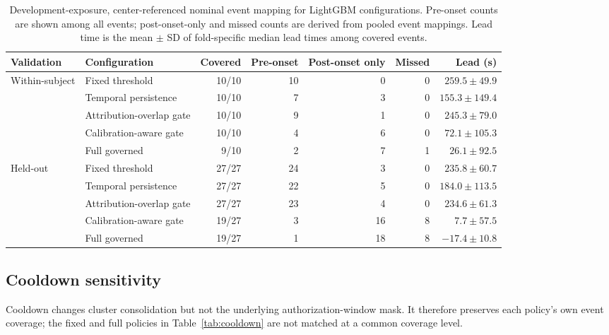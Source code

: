 \documentclass[11pt,a4paper]{article}
\begin{document}
\begin{table}[H]
\centering
\caption{Development-exposure, center-referenced nominal event mapping for LightGBM configurations. Pre-onset counts are shown among all events; post-onset-only and missed counts are derived from pooled event mappings. Lead time is the mean $\pm$ SD of fold-specific median lead times among covered events.}
\label{tab:event_level_full}
\scriptsize
\setlength{\tabcolsep}{4pt}
\begin{tabular}{llrrrrr}
\toprule
Validation & Configuration & Covered & Pre-onset & Post-onset only & Missed & Lead (s) \\
\midrule
\multirow{5}{*}{Within-subject}
& Fixed threshold & 10/10 & 10 & 0 & 0 & $259.5\pm49.9$ \\
& Temporal persistence & 10/10 & 7 & 3 & 0 & $155.3\pm149.4$ \\
& Attribution-overlap gate & 10/10 & 9 & 1 & 0 & $245.3\pm79.0$ \\
& Calibration-aware gate & 10/10 & 4 & 6 & 0 & $72.1\pm105.3$ \\
& Full governed & 9/10 & 2 & 7 & 1 & $26.1\pm92.5$ \\
\midrule
\multirow{5}{*}{Held-out}
& Fixed threshold & 27/27 & 24 & 3 & 0 & $235.8\pm60.7$ \\
& Temporal persistence & 27/27 & 22 & 5 & 0 & $184.0\pm113.5$ \\
& Attribution-overlap gate & 27/27 & 23 & 4 & 0 & $234.6\pm61.3$ \\
& Calibration-aware gate & 19/27 & 3 & 16 & 8 & $7.7\pm57.5$ \\
& Full governed & 19/27 & 1 & 18 & 8 & $-17.4\pm10.8$ \\
\bottomrule
\end{tabular}
\end{table}
\FloatBarrier

\subsection{Cooldown sensitivity}

Cooldown changes cluster consolidation but not the underlying authorization-window mask. It therefore preserves each policy's own event coverage; the fixed and full policies in Table~\ref{tab:cooldown} are not matched at a common coverage level.
\end{document}
